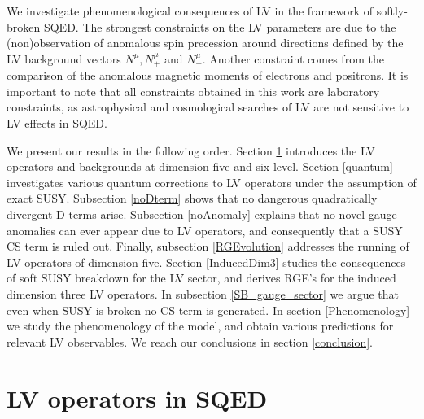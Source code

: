 \documentclass[12pt]{revtex4}
\begin{document}
We investigate phenomenological consequences of LV in the framework of
softly-broken SQED. The strongest constraints on the LV parameters are
due to the (non)observation of anomalous spin precession
around directions defined by the LV background vectors $N^\mu,
N_+^\mu$ and $N_-^\mu$. Another constraint comes from the
comparison of the anomalous magnetic moments of electrons and  
positrons. It is important to note that all constraints obtained in this 
work are laboratory constraints, as astrophysical and cosmological 
searches of LV are not sensitive to LV effects in SQED. 


We present our results in the following order. Section \ref{LVoperators} 
introduces the LV operators and backgrounds at dimension five and six
level. Section \ref{quantum} investigates various quantum corrections
to LV operators under the assumption of exact SUSY. Subsection
\ref{noDterm} shows that no dangerous quadratically divergent D-terms
arise. Subsection \ref{noAnomaly} explains that no novel gauge
anomalies can ever appear due to LV operators, and consequently that
a SUSY CS term is ruled out. Finally, subsection \ref{RGEvolution}
addresses the running of LV operators of dimension five. Section
\ref{InducedDim3} studies the consequences of soft SUSY breakdown for
the LV sector, and derives RGE's for the induced dimension three LV
operators. In subsection \ref{SB_gauge_sector} we argue that even when
SUSY is broken no CS term is generated. In section \ref{Phenomenology}
we study the phenomenology of the model, and obtain various
predictions for relevant LV observables.  We reach our conclusions in
section 
\ref{conclusion}.   


\section{LV operators in SQED} 
\label{LVoperators}
\end{document}

